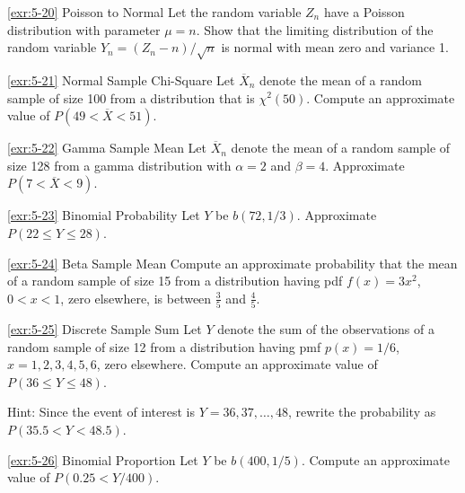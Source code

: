 \begin{exercise}{\ref{exr:5-20} Poisson to Normal}\label{exr:5-20}
Let the random variable $Z_n$ have a Poisson distribution with parameter $\mu = n$. Show that the limiting distribution of the random variable $Y_n = (Z_n - n)/\sqrt{n}$ is normal with mean zero and variance 1.
\end{exercise}

\begin{exercise}{\ref{exr:5-21} Normal Sample Chi-Square}\label{exr:5-21}
Let $\overline{X}_n$ denote the mean of a random sample of size 100 from a distribution that is $\chi^2(50)$. Compute an approximate value of $P(49 < \overline{X} < 51)$.
\end{exercise}

\begin{exercise}{\ref{exr:5-22} Gamma Sample Mean}\label{exr:5-22}
Let $\overline{X}_n$ denote the mean of a random sample of size 128 from a gamma distribution with $\alpha = 2$ and $\beta = 4$. Approximate $P(7 < \overline{X} < 9)$.
\end{exercise}

\begin{exercise}{\ref{exr:5-23} Binomial Probability}\label{exr:5-23}
Let $Y$ be $b(72, 1/3)$. Approximate $P(22 \leq Y \leq 28)$.
\end{exercise}

\begin{exercise}{\ref{exr:5-24} Beta Sample Mean}\label{exr:5-24}
Compute an approximate probability that the mean of a random sample of size 15 from a distribution having pdf $f(x) = 3x^2$, $0 < x < 1$, zero elsewhere, is between $\frac{3}{5}$ and $\frac{4}{5}$.
\end{exercise}

\begin{exercise}{\ref{exr:5-25} Discrete Sample Sum}\label{exr:5-25}
Let $Y$ denote the sum of the observations of a random sample of size 12 from a distribution having pmf $p(x) = 1/6$, $x = 1, 2, 3, 4, 5, 6$, zero elsewhere. Compute an approximate value of $P(36 \leq Y \leq 48)$.

Hint: Since the event of interest is $Y = 36, 37, \ldots, 48$, rewrite the probability as $P(35.5 < Y < 48.5)$.
\end{exercise}

\begin{exercise}{\ref{exr:5-26} Binomial Proportion}\label{exr:5-26}
Let $Y$ be $b(400, 1/5)$. Compute an approximate value of $P(0.25 < Y/400)$.
\end{exercise}

